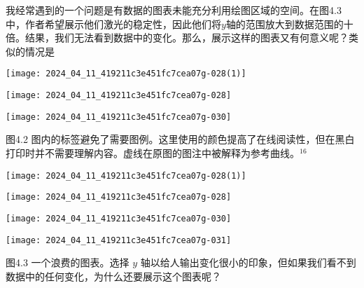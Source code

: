 我经常遇到的一个问题是有数据的图表未能充分利用绘图区域的空间。在图4.3中，作者希望展示他们激光的稳定性，因此他们将$y$轴的范围放大到数据范围的十倍。结果，我们无法看到数据中的变化。那么，展示这样的图表又有何意义呢？类似的情况是

\begin{center}
\texttt{[image: 2024\_04\_11\_419211c3e451fc7cea07g-028(1)]}
\end{center}
\begin{center}
\texttt{[image: 2024\_04\_11\_419211c3e451fc7cea07g-028]}
\end{center}
\begin{center}
\texttt{[image: 2024\_04\_11\_419211c3e451fc7cea07g-030]}
\end{center}

图4.2 图内的标签避免了需要图例。这里使用的颜色提高了在线阅读性，但在黑白打印时并不需要理解内容。虚线在原图的图注中被解释为参考曲线。${ }^{16}$

\begin{center}
\texttt{[image: 2024\_04\_11\_419211c3e451fc7cea07g-028(1)]}
\end{center}
\begin{center}
\texttt{[image: 2024\_04\_11\_419211c3e451fc7cea07g-028]}
\end{center}
\begin{center}
\texttt{[image: 2024\_04\_11\_419211c3e451fc7cea07g-030]}
\end{center}
\begin{center}
\texttt{[image: 2024\_04\_11\_419211c3e451fc7cea07g-031]}
\end{center}

图4.3 一个浪费的图表。选择 $y$ 轴以给人输出变化很小的印象，但如果我们看不到数据中的任何变化，为什么还要展示这个图表呢？

